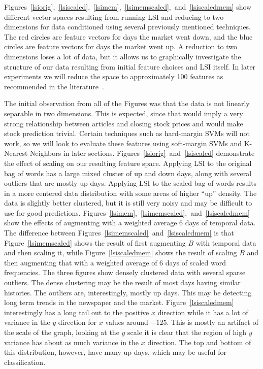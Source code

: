 \documentclass[10pt, twocolumn]{article}
\begin{document}
Figures~\ref{lsiorig},~\ref{lsiscaled},~\ref{lsimem},~\ref{lsimemscaled},~and~\ref{lsiscaledmem} show different vector spaces resulting from running LSI and reducing to two dimensions for data conditioned using several previously mentioned techniques. The red circles are feature vectors for days the market went down, and the blue circles are feature vectors for days the market went up. A reduction to two dimensions loses a lot of data, but it allows us to graphically investigate the structure of our data resulting from initial feature choices and LSI itself. In later experiments we will reduce the space to approximately 100 features as recommended in the literature~\cite{lsi}.  

The initial observation from all of the Figures was that the data is not linearly separable in two dimensions. This is expected, since that would imply a very strong relationship between articles and closing stock prices and would make stock prediction trivial. Certain techniques such as hard-margin SVMs will not work, so we will look to evaluate these features using soft-margin SVMs and K-Nearest-Neighbors in later sections. Figures~\ref{lsiorig}~and~\ref{lsiscaled} demonstrate the effect of scaling on our resulting feature space. Applying LSI to the original bag of words has a large mixed cluster of up and down days, along with several outliers that are mostly up days. Applying LSI to the scaled bag of words results in a more centered data distribution with some areas of higher ``up'' density. The data is slightly better clustered, but it is still very noisy and may be difficult to use for good predictions. Figures~\ref{lsimem},~\ref{lsimemscaled},~and~\ref{lsiscaledmem} show the effects of augmenting with a weighted average 6 days of temporal data. The difference between Figures~\ref{lsimemscaled}~and~\ref{lsiscaledmem} is that Figure~\ref{lsimemscaled} shows the result of first augmenting $B$ with temporal data and then scaling it, while Figure~\ref{lsiscaledmem} shows the result of scaling $B$ and then augmenting that with a weighted average of 6 days of scaled word frequencies. The three figures show densely clustered data with several sparse outliers. The dense clustering may be the result of most days having similar histories. The outliers are, interestingly, mostly up days. This may be detecting long term trends in the newspaper and the market. Figure~\ref{lsiscaledmem} interestingly has a long tail out to the positive $x$ direction while it has a lot of variance in the $y$ direction for $x$ values around $-125$. This is mostly an artifact of the scale of the graph, looking at the $y$ scale it is clear that the region of high $y$ variance has about as much variance in the $x$ direction. The top and bottom of this distribution, however, have many up days, which may be useful for classification.
\end{document}
